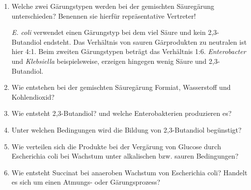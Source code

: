 \begin{enumerate}
	\item Welche zwei Gärungstypen werden bei der gemischten Säuregärung unterschieden? Benennen sie hierfür repräsentative Vertreter!
	
		\emph{E. coli} verwendet einen Gärungstyp bei dem viel Säure und kein 2,3-Butandiol endsteht.
		Das Verhältnis von sauren Gärprodukten zu neutralen ist hier 4:1.
		Beim  zweiten Gärungstypen beträgt das Verhältnis 1:6.
		\emph{Enterobacter} und \emph{Klebsiella} beispielsweise,
		erzeigen hingegen wenig Säure und 2,3-Butandiol.

	\item Wie entstehen bei der gemischten Säuregärung Formiat, Wasserstoff und Kohlendioxid?
	\item Wie entsteht 2,3-Butandiol? und welche Enterobakterien produzieren es?
	\item Unter welchen Bedingungen wird die Bildung von 2,3-Butandiol begünstigt?
	\item Wie verteilen sich die Produkte bei der Vergärung von Glucose durch Escherichia coli bei Wachstum unter alkalischen bzw. sauren Bedingungen?
	\item Wie entsteht Succinat bei anaeroben Wachstum von Escherichia coli? Handelt es sich um einen Atmungs- oder Gärungsprozess?
\end{enumerate}
